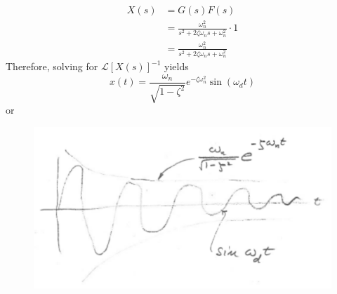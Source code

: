 \documentclass[12pt,letter]{article}
\numberwithin{ex}{section} %
\numberwithin{re}{section} %
\newcommand{\Laplace}[1]{\ensuremath{\mathcal{L}{\left[#1\right]}}}
\numberwithin{equation}{section}	%
\begin{document}
\begin{align}
X(s) &= G(s)F(s) \\
&= \frac{\omega_n^2}{s^2 + 2 \zeta \omega_n s + \omega_n^2} \cdot 1\nonumber \\
&=  \frac{\omega_n^2}{s^2 + 2 \zeta \omega_n s + \omega_n^2}
\end{align}
Therefore, solving for $\Laplace{X(s)}^{-1}$ yields
\begin{equation}
x(t) = \frac{\omega_n}{\sqrt{1-\zeta^2}} e^{-\zeta \omega_n^2} \sin(\omega_dt)
\end{equation}
or
\begin{figure}[H]
	\centering
	\includegraphics[width=4.5in]{../figures/x_t_impulse_time_response_2nd_order}
\end{figure}
\end{document}
